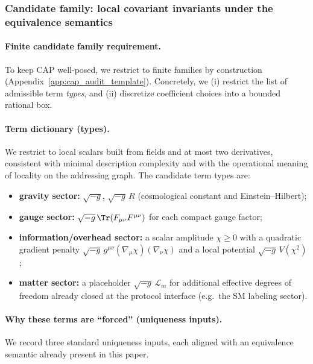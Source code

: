 \subsubsection{Candidate family: local covariant invariants under the equivalence semantics}
\label{subsec:cap_action_candidate_family}

\paragraph{Finite candidate family requirement.}
\AuditTag To keep CAP well-posed, we restrict to finite families by construction (Appendix~\ref{app:cap_audit_template}).
Concretely, we (i) restrict the list of admissible term \emph{types}, and (ii) discretize coefficient choices into a bounded rational box.

\paragraph{Term dictionary (types).}
\InterfaceTag We restrict to local scalars built from fields and at most two derivatives, consistent with minimal description complexity and with the operational meaning of locality on the addressing graph.
The candidate term types are:
\begin{itemize}
\item \textbf{gravity sector:} $\sqrt{-g}$, $\sqrt{-g}\,R$ (cosmological constant and Einstein--Hilbert);
\item \textbf{gauge sector:} $\sqrt{-g}\,\Tr(F_{\mu\nu}F^{\mu\nu})$ for each compact gauge factor;
\item \textbf{information/overhead sector:} a scalar amplitude $\chi\ge 0$ with a quadratic gradient penalty $\sqrt{-g}\,g^{\mu\nu}(\nabla_\mu\chi)(\nabla_\nu\chi)$ and a local potential $\sqrt{-g}\,V(\chi^2)$;
\item \textbf{matter sector:} a placeholder $\sqrt{-g}\,\mathcal{L}_m$ for additional effective degrees of freedom already closed at the protocol interface (e.g.\ the SM labeling sector).
\end{itemize}

\paragraph{Why these terms are ``forced'' (uniqueness inputs).}
We record three standard uniqueness inputs, each aligned with an equivalence semantic already present in this paper.

